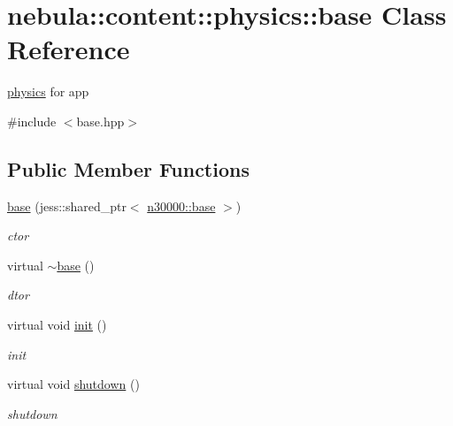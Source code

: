 \hypertarget{classnebula_1_1content_1_1physics_1_1base}{
\section{nebula::content::physics::base Class Reference}
\label{classnebula_1_1content_1_1physics_1_1base}
}


\hyperlink{namespacenebula_1_1content_1_1physics}{physics} for app  


{\ttfamily \#include $<$base.hpp$>$}\subsection*{Public Member Functions}
\begin{DoxyCompactItemize}
\item 
\hyperlink{classnebula_1_1content_1_1physics_1_1base_a800356f190e4a2e4aaccf53d3fd1e8bf}{base} (jess::shared\_\-ptr$<$ \hyperlink{classnebula_1_1content_1_1base}{n30000::base} $>$)
\begin{DoxyCompactList}\small\item\em ctor \item\end{DoxyCompactList}\item 
virtual \hyperlink{classnebula_1_1content_1_1physics_1_1base_a980739fcd78d28fbbe4b02f46b3cd97e}{$\sim$base} ()
\begin{DoxyCompactList}\small\item\em dtor \item\end{DoxyCompactList}\item 
virtual void \hyperlink{classnebula_1_1content_1_1physics_1_1base_ac797ea2145a84c7929d32c303f0c41ef}{init} ()
\begin{DoxyCompactList}\small\item\em init \item\end{DoxyCompactList}\item 
virtual void \hyperlink{classnebula_1_1content_1_1physics_1_1base_aeb6cf6fb210e1c83b1adef563470c737}{shutdown} ()
\begin{DoxyCompactList}\small\item\em shutdown \item\end{DoxyCompactList}\end{DoxyCompactItemize}
